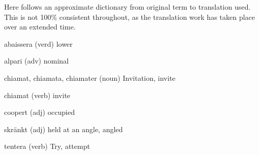 \newpage
{}

Here follows an approximate dictionary from original term to translation used. This is not 100\% consistent throughout, as the translation work has taken place over an extended time.

\begin{description}
\item{abaissera} (verd) lower
\item{alpari} (adv) nominal
\item{chiamat, chiamata, chiamater} (noun) Invitation, invite
\item{chiamat} (verb) invite
\item{coopert} (adj) occupied
\item{skränkt} (adj) held at an angle, angled
\item{tentera} (verb) Try, attempt
\end{description}